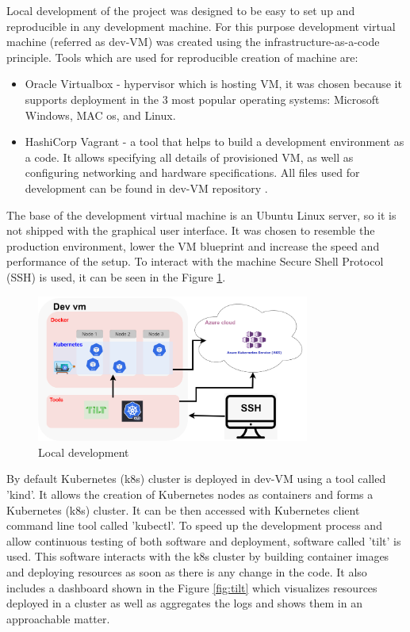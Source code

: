 Local development of the project was designed to be easy to set up and reproducible in any development machine. For this purpose development virtual machine (referred as dev-VM) was created using the infrastructure-as-a-code principle. Tools which are used for reproducible creation of machine are:
\begin{itemize}
    \item Oracle Virtualbox \cite{virtual_box} - hypervisor which is hosting VM, it was chosen because it supports deployment in the 3 most popular operating systems: Microsoft Windows, MAC os, and Linux.
    \item HashiCorp Vagrant \cite{vagrant} - a tool that helps to build a development environment as a code. It allows specifying all details of provisioned VM, as well as configuring networking and hardware specifications. All files used for development can be found in dev-VM repository \cite{dev_vm}.
\end{itemize}

The base of the development virtual machine is an Ubuntu Linux server, so it is not shipped with the graphical user interface. It was chosen to resemble the production environment, lower the VM blueprint and increase the speed and performance of the setup. To interact with the machine Secure Shell Protocol (SSH) is used, it can be seen in the Figure \ref{fig:local_development}.

\begin{figure}[H]
    \centering
    \includegraphics[width=0.8\textwidth]{pictures/development_setup.png}
    \caption{Local development}
    \label{fig:local_development}
\end{figure}

By default Kubernetes (k8s) cluster is deployed in dev-VM using a tool called 'kind'. It allows the creation of Kubernetes nodes as containers and forms a Kubernetes (k8s) cluster. It can be then accessed with Kubernetes client command line tool called 'kubectl'. To speed up the development process and allow continuous testing of both software and deployment, software called 'tilt' is used. This software interacts with the k8s cluster by building container images and deploying resources as soon as there is any change in the code. It also includes a dashboard shown in the Figure \ref{fig:tilt} which visualizes resources deployed in a cluster as well as aggregates the logs and shows them in an approachable matter.


